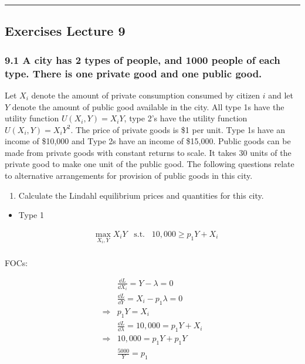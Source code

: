 \documentclass[]{article}
\providecommand{\tightlist}{%
  \setlength{\itemsep}{0pt}\setlength{\parskip}{0pt}}
\begin{document}
\begin{center}\rule{0.5\linewidth}{\linethickness}\end{center}

\subsection{Exercises Lecture 9}\label{exercises-lecture-9}

\subsubsection{9.1 A city has 2 types of people, and 1000 people of each
type. There is one private good and one public
good.}\label{a-city-has-2-types-of-people-and-1000-people-of-each-type.-there-is-one-private-good-and-one-public-good.}

Let \(X_i\) denote the amount of private consumption consumed by citizen
\(i\) and let \(Y\) denote the amount of public good available in the
city. All type 1s have the utility function \(U(X_i, Y) = X_iY\), type
2's have the utility function \(U(X_i, Y) = X_iY^2\). The price of
private goods is \$1 per unit. Type 1s have an income of \$10,000 and
Type 2s have an income of \$15,000. Public goods can be made from
private goods with constant returns to scale. It takes 30 units of the
private good to make one unit of the public good. The following
questions relate to alternative arrangements for provision of public
goods in this city.

\begin{enumerate}
\def\labelenumi{\alph{enumi})}
\tightlist
\item
  Calculate the Lindahl equilibrium prices and quantities for this city.
\end{enumerate}

\begin{itemize}
\tightlist
\item
  Type 1
\end{itemize}

\begin{align*}
        & \max \limits_{X_i, Y} X_iY \hspace{10pt} \text{s.t.} \hspace{10pt} 10,000 \geq p_1Y + X_i \\
\end{align*}

FOCs:

\begin{align*}
    &\frac{\dd L}{\dd X_i} = Y - \lambda = 0  \\
    &\frac{\dd L}{\dd Y} = X_i - p_1\lambda = 0  \\
    \Rightarrow & p_1Y = X_i \\
    &\frac{\dd L}{\dd \lambda} = 10,000  =  p_1Y + X_i \\
    \Rightarrow & 10,000 = p_1Y + p_1Y \\
    &\frac{5000}{Y} = p_1
\end{align*}
\end{document}
